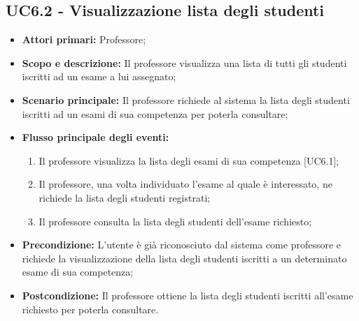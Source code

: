 \documentclass[AnalisiDeiRequisiti.tex]{subfiles}
\begin{document}
\subsection{UC6.2 - Visualizzazione lista degli studenti}
\begin{itemize}
	\item \textbf{Attori primari:} Professore;\\
	\item \textbf{Scopo e descrizione:} Il professore visualizza una lista di tutti gli studenti iscritti ad un esame a lui assegnato;\\
	\item \textbf{Scenario principale:} Il professore richiede al sistema la lista degli studenti iscritti ad un esami di sua competenza per poterla consultare;\\
	\item \textbf{Flusso principale degli eventi:}\\
	\begin{enumerate}
		\item Il professore visualizza la lista degli esami di sua competenza [UC6.1];
		\item Il professore, una volta individuato l'esame al quale è interessato, ne richiede la lista degli studenti registrati;
		\item Il professore consulta la lista degli studenti dell'esame richiesto;
	\end{enumerate}
	\item \textbf{Precondizione:} L'utente è già riconosciuto dal sistema come professore e richiede la visualizzazione della lista degli studenti iscritti a un determinato esame di sua competenza;\\
	\item \textbf{Postcondizione:} Il professore ottiene la lista degli studenti iscritti all'esame richiesto per poterla consultare.\\
\end{itemize}
\end{document}
